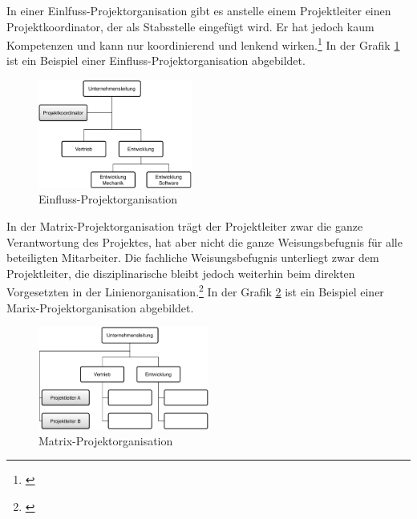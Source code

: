 In einer Einlfuss-Projektorganisation gibt es anstelle einem Projektleiter
einen Projektkoordinator, der als Stabsstelle eingefügt wird. Er hat jedoch kaum
Kompetenzen und kann nur koordinierend und lenkend wirken.\footnote{\citealp*[Vgl.][S. 57]{burghardt2007einfuehrung}}
In der Grafik \ref{pic:05_projektorganisationen_einfluss}
ist ein Beispiel einer Einfluss-Projektorganisation abgebildet.

\begin{figure}[htbp]
\begin{center}
\includegraphics[width=0.45\textwidth,angle=0]{./bilder/theorie/05_projektorganisationen_einfluss.pdf}
\caption[Einfluss-Projektorganisation]{Einfluss-Projektorganisation\footnotemark}
\label{pic:05_projektorganisationen_einfluss}
\end{center}
\end{figure}

In der Matrix-Projektorganisation trägt der Projektleiter zwar die ganze Verantwortung
des Projektes, hat aber nicht die ganze Weisungsbefugnis für alle beteiligten Mitarbeiter.
Die fachliche Weisungsbefugnis unterliegt zwar dem Projektleiter, die disziplinarische
bleibt jedoch weiterhin beim direkten Vorgesetzten in der Linienorganisation.\footnote{\citealp*[Vgl.][S. 58]{burghardt2007einfuehrung}}
In der Grafik \ref{pic:05_projektorganisationen_matrix} ist ein Beispiel einer 
Marix-Projektorganisation abgebildet.

\begin{figure}[htbp]
\begin{center}
\includegraphics[width=0.5\textwidth,angle=0]{./bilder/theorie/05_projektorganisationen_matrix.pdf}
\caption[Matrix-Projektorganisation]{Matrix-Projektorganisation\footnotemark}
\label{pic:05_projektorganisationen_matrix}
\end{center}
\end{figure}


